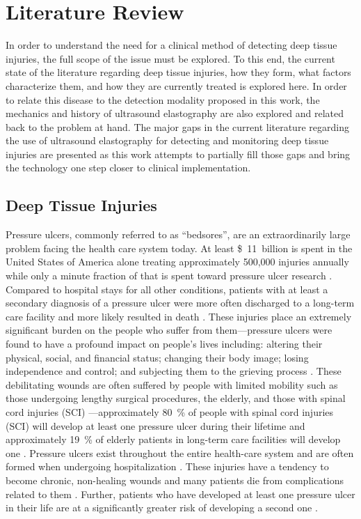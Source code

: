 \chapter{Literature Review}
\label{chap:litreview}
	In order to understand the need for a clinical method of detecting deep tissue injuries, the full scope of the issue must be explored. To this end, the current state of the literature regarding deep tissue injuries, how they form, what factors characterize them, and how they are currently treated is explored here. In order to relate this disease to the detection modality proposed in this work, the mechanics and history of ultrasound elastography are also explored and related back to the problem at hand. The major gaps in the current literature regarding the use of ultrasound elastography for detecting and monitoring deep tissue injuries are presented as this work attempts to partially fill those gaps and bring the technology one step closer to clinical implementation.

	\section{Deep Tissue Injuries}
		Pressure ulcers, commonly referred to as ``bedsores'', are an extraordinarily large problem facing the health care system today. At least \SI{11}[\$]{billion} is spent in the United States of America alone treating approximately 500,000 injuries annually \cite{beckrich99,russo08} while only a minute fraction of that is spent toward pressure ulcer research \cite{zanca03}. Compared to hospital stays for all other conditions, patients with at least a secondary diagnosis of a pressure ulcer were more often discharged to a long-term care facility and more likely resulted in death \cite{russo08}. These injuries place an extremely significant burden on the people who suffer from them---pressure ulcers were found to have a profound impact on people's lives including: altering their physical, social, and financial status; changing their body image; losing independence and control; and subjecting them to the grieving process \cite{langemo00,baharestani94}. These debilitating wounds are often suffered by people with limited mobility such as those undergoing lengthy surgical procedures, the elderly, and those with spinal cord injuries (SCI) \cite{allman95}---approximately \SI{80}{\percent} of people with spinal cord injuries (SCI) will develop at least one pressure ulcer during their lifetime \cite{salzberg96} and approximately \SI{19}{\percent} of elderly patients in long-term care facilities will develop one \cite{freitas11}. Pressure ulcers exist throughout the entire health-care system and are often formed when undergoing hospitalization \cite{aronovitch99}. These injuries have a tendency to become chronic, non-healing wounds and many patients die from complications related to them \cite{jaul10}. Further, patients who have developed at least one pressure ulcer in their life are at a significantly greater risk of developing a second one \cite{niazi97}. 

